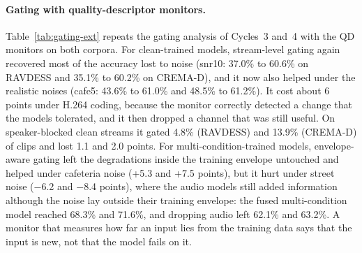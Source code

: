 \paragraph{Gating with quality-descriptor monitors.} Table~\ref{tab:gating-ext} repeats the gating analysis of Cycles~3 and~4 with the QD monitors on both corpora. For clean-trained models, stream-level gating again recovered most of the accuracy lost to noise (snr10: 37.0\% to 60.6\% on RAVDESS and 35.1\% to 60.2\% on CREMA-D), and it now also helped under the realistic noises (cafe5: 43.6\% to 61.0\% and 48.5\% to 61.2\%). It cost about 6 points under H.264 coding, because the monitor correctly detected a change that the models tolerated, and it then dropped a channel that was still useful. On speaker-blocked clean streams it gated 4.8\% (RAVDESS) and 13.9\% (CREMA-D) of clips and lost 1.1 and 2.0 points. For multi-condition-trained models, envelope-aware gating left the degradations inside the training envelope untouched and helped under cafeteria noise (+5.3 and +7.5 points), but it hurt under street noise ($-$6.2 and $-$8.4 points), where the audio models still added information although the noise lay outside their training envelope: the fused multi-condition model reached 68.3\% and 71.6\%, and dropping audio left 62.1\% and 63.2\%. A monitor that measures how far an input lies from the training data says that the input is new, not that the model fails on it.

